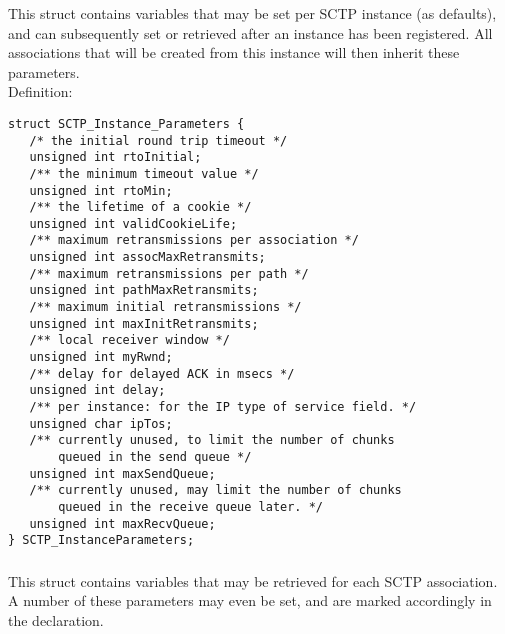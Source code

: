 \documentclass[10pt]{article}
\newcommand{\bv}{\vspace{0,1cm}\noindent \\ Definition:\footnotesize\begin{verbatim}}
\newcommand{\n}{\normalsize}
\begin{document}
\subsubsection{}
\label{instance-params}
This struct contains variables that may be set per SCTP instance (as defaults),
and can subsequently set or retrieved after an instance has been registered.
All associations that will be created from this instance will then inherit
these parameters.
\bv
struct SCTP_Instance_Parameters {
   /* the initial round trip timeout */
   unsigned int rtoInitial;
   /** the minimum timeout value */
   unsigned int rtoMin;
   /** the lifetime of a cookie */
   unsigned int validCookieLife;
   /** maximum retransmissions per association */
   unsigned int assocMaxRetransmits;
   /** maximum retransmissions per path */
   unsigned int pathMaxRetransmits;
   /** maximum initial retransmissions */
   unsigned int maxInitRetransmits;
   /** local receiver window */
   unsigned int myRwnd;
   /** delay for delayed ACK in msecs */
   unsigned int delay;
   /** per instance: for the IP type of service field. */
   unsigned char ipTos;
   /** currently unused, to limit the number of chunks
       queued in the send queue */
   unsigned int maxSendQueue;
   /** currently unused, may limit the number of chunks
       queued in the receive queue later. */
   unsigned int maxRecvQueue;
} SCTP_InstanceParameters;
\end{verbatim}
\n


\subsubsection{}
\label{association-status}
This struct contains variables that may be retrieved for each
 SCTP association.
A number of these parameters may even be set, and are marked accordingly in
the declaration.
\end{document}
